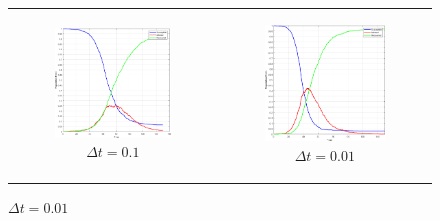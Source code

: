 \begin{figure}
\begin{center}
	\begin{tabular}{c c}
		\begin{subfigure}[b]{0.4\textwidth}
			\centering
			\includegraphics[width=1\textwidth, angle=0]{./fig/timedriven/SIR_Yampa/SIR_Yampa_dt01.png}
			\caption{$\Delta t = 0.1$}
			\label{fig:sir_abs_approximating_01dt_1000agents}
		\end{subfigure}
		
		&
    	
		\begin{subfigure}[b]{0.4\textwidth}
			\centering
			\includegraphics[width=1\textwidth, angle=0]{./fig/timedriven/SIR_Yampa/SIR_Yampa_dt001.png}
			\caption{$\Delta t = 0.01$}
			\label{fig:sir_abs_approximating_001dt_1000agents}
		\end{subfigure}
	\end{tabular}
	

\end{center}
\end{figure}
